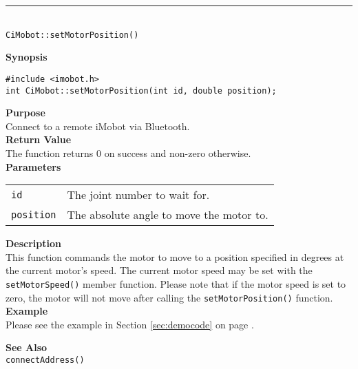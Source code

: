 \noindent
\vspace{5pt}
\rule{4.5in}{0.015in}\\
\noindent
{\LARGE \texttt{CiMobot::setMotorPosition()}}\\
{}

\noindent
{\bf Synopsis}\\
\begin{verbatim}
#include <imobot.h>
int CiMobot::setMotorPosition(int id, double position);
\end{verbatim}

\noindent
{\bf Purpose}\\
Connect to a remote iMobot via Bluetooth.\\

\noindent
{\bf Return Value}\\
The function returns 0 on success and non-zero otherwise.\\

\noindent
{\bf Parameters}\\
\vspace{-0.1in}
\begin{description}
\item               
\begin{tabular}{p{20 mm}p{145 mm}}
\texttt{id} & The joint number to wait for. \\
\texttt{position} & The absolute angle to move the motor to.  \\
\end{tabular}
\end{description}

\noindent
{\bf Description}\\
This function commands the motor to move to a position specified in degrees at
the current motor's speed. The current motor speed may be set with the
\texttt{setMotorSpeed()} member function. Please note that if the motor speed
is set to zero, the motor will not move after calling the
\texttt{setMotorPosition()} function. \\

\noindent
{\bf Example}\\
Please see the example in Section \ref{sec:democode} on page \pageref{sec:democode}.\\
\noindent

\noindent
{\bf See Also}\\
\texttt{connectAddress()}

